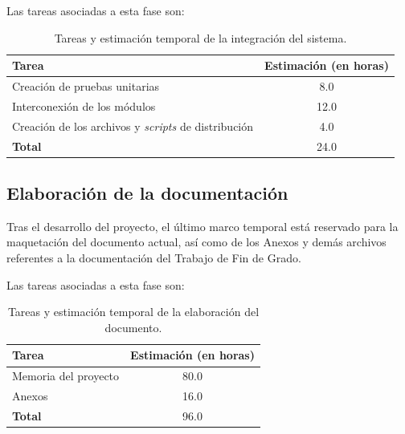 Las tareas asociadas a esta fase son:\sn

\begin{table}[ht]
    \begin{center}
        \begin{tabular}{| l | c |}
            \hline
            \textbf{Tarea} & \textbf{Estimación} (en horas) \\
            \hline
            Creación de pruebas unitarias       & 8.0 \\ \hline
            Interconexión de los módulos        & 12.0 \\ \hline
            Creación de los archivos y \textit{scripts} de distribución         & 4.0 \\ \hline
            \textbf{Total}                      & 24.0 \\ \hline
        \end{tabular}
    \end{center}
    \caption{Tareas y estimación temporal de la integración del sistema.}
    \label{tab:phase7}
\end{table}

\subsection{Elaboración de la documentación} \label{sub:makedoc}

Tras el desarrollo del proyecto, el último marco temporal está reservado para la maquetación del documento actual, así como de los Anexos y demás archivos referentes a la documentación del Trabajo de Fin de Grado.\sn

Las tareas asociadas a esta fase son:\sn

\begin{table}[ht]
    \begin{center}
        \begin{tabular}{| l | c |}
            \hline
            \textbf{Tarea} & \textbf{Estimación} (en horas) \\
            \hline
            Memoria del proyecto    & 80.0 \\ \hline
            Anexos                  & 16.0 \\ \hline
            \textbf{Total}          & 96.0 \\ \hline
        \end{tabular}
    \end{center}
    \caption{Tareas y estimación temporal de la elaboración del documento.}
    \label{tab:phase8}
\end{table}

